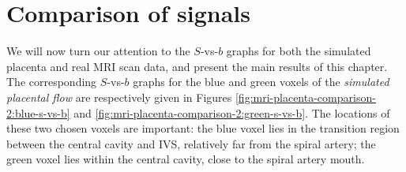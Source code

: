     \section{Comparison of signals} \label{sec:numerical-mri:comparison}
        We will now turn our attention to the $S$-vs-$b$ graphs for both the simulated placenta and real MRI scan data, and present the main results of this chapter. The corresponding $S$-vs-$b$ graphs for the blue and green voxels of the \textit{simulated placental flow} are respectively given in Figures \ref{fig:mri-placenta-comparison-2:blue-s-vs-b} and \ref{fig:mri-placenta-comparison-2:green-s-vs-b}. The locations of these two chosen voxels are important: the blue voxel lies in the transition region between the central cavity and IVS, relatively far from the spiral artery; the green voxel lies within the central cavity, close to the spiral artery mouth.

